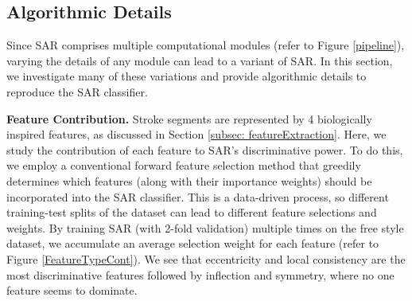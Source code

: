 \vspace{-2mm}
\subsection{Algorithmic Details} \label{subsec:variations}
\vspace{-2mm}
Since SAR comprises multiple computational modules (refer to Figure \ref{pipeline}), varying the details of any module can lead to a variant of SAR. In this section, we investigate many of these variations and provide algorithmic details to reproduce the SAR classifier.


\noindent\textbf{Feature Contribution.} Stroke segments are represented by 4 biologically inspired features, as discussed in Section \ref{subsec: featureExtraction}. Here, we study the contribution of each feature to SAR's discriminative power. To do this, we employ a conventional forward feature selection method that greedily determines which features (along with their importance weights) should be incorporated into the SAR classifier. This is a data-driven process, so different training-test splits of the dataset can lead to different feature selections and weights. By training SAR (with 2-fold validation) multiple times on the free style dataset, we accumulate an average selection weight for each feature (refer to Figure \ref{FeatureTypeCont}). We see that eccentricity and local consistency are the most discriminative features followed by inflection and symmetry, where no one feature seems to dominate.


